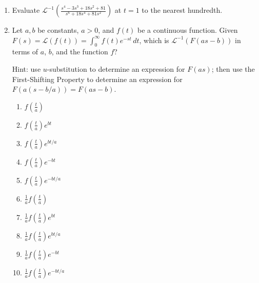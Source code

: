 \documentclass{ximera}
\begin{document}
\begin{enumerate}[label=(\arabic*)]


\item Evaluate $\displaystyle \mathcal{L}^{-1}\left(\frac{s^4-3s^3+18s^2+81}{s^6+18s^4+81s^2}\right)$ at $t=1$ to the nearest hundredth.



\newpage


\item Let $a,b$ be constants, $a>0$, and $f(t)$ be a continuous function. Given $\displaystyle F(s)=\mathcal{L}(f(t))=\int_0^{\infty} f(t)e^{-st}\,dt$, which is $\mathcal{L}^{-1}(F(as-b))$ in terms of $a$, $b$, and the function $f$?

Hint: use $u$-substitution to determine an expression for $F(as)$; then use the First-Shifting Property to determine an expression for\\ $F(a(s-b/a))=F(as-b)$.



\begin{enumerate}[label=(\alph*)]
\item $\displaystyle f\left(\frac{t}{a}\right)$
\item $\displaystyle f\left(\frac{t}{a}\right)e^{bt}$
\item $\displaystyle f\left(\frac{t}{a}\right)e^{bt/a}$
\item $\displaystyle f\left(\frac{t}{a}\right)e^{-bt}$
\item $\displaystyle f\left(\frac{t}{a}\right)e^{-bt/a}$
\item $\displaystyle \frac{1}{a}f\left(\frac{t}{a}\right)$
\item $\displaystyle \frac{1}{a}f\left(\frac{t}{a}\right)e^{bt}$
\item $\displaystyle \frac{1}{a}f\left(\frac{t}{a}\right)e^{bt/a}$ %
\item $\displaystyle \frac{1}{a}f\left(\frac{t}{a}\right)e^{-bt}$
\item $\displaystyle \frac{1}{a}f\left(\frac{t}{a}\right)e^{-bt/a}$
\end{enumerate}









\end{enumerate}
\end{document}
